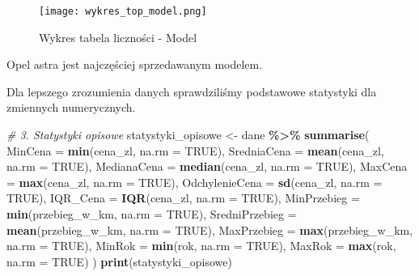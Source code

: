 \documentclass[
]{article}
\newenvironment{Shaded}{\begin{snugshade}}{\end{snugshade}}
\newcommand{\AttributeTok}[1]{\textcolor[rgb]{0.13,0.29,0.53}{#1}}
\newcommand{\CommentTok}[1]{\textcolor[rgb]{0.56,0.35,0.01}{\textit{#1}}}
\newcommand{\ConstantTok}[1]{\textcolor[rgb]{0.56,0.35,0.01}{#1}}
\newcommand{\FunctionTok}[1]{\textcolor[rgb]{0.13,0.29,0.53}{\textbf{#1}}}
\newcommand{\NormalTok}[1]{#1}
\newcommand{\OtherTok}[1]{\textcolor[rgb]{0.56,0.35,0.01}{#1}}
\newcommand{\SpecialCharTok}[1]{\textcolor[rgb]{0.81,0.36,0.00}{\textbf{#1}}}
\begin{document}
\begin{figure}
\centering
\texttt{[image: wykres\_top\_model.png]}
\caption{Wykres tabela liczności - Model}
\end{figure}

Opel astra jest najczęściej sprzedawanym modelem.

Dla lepszego zrozumienia danych sprawdziliśmy podstawowe statystyki dla
zmiennych numerycznych.

\begin{Shaded}
\begin{Highlighting}[]
\CommentTok{\# 3. Statystyki opisowe}
\NormalTok{statystyki\_opisowe }\OtherTok{\textless{}{-}}\NormalTok{ dane }\SpecialCharTok{\%\textgreater{}\%}
  \FunctionTok{summarise}\NormalTok{(}
    \AttributeTok{MinCena =} \FunctionTok{min}\NormalTok{(cena\_zl, }\AttributeTok{na.rm =} \ConstantTok{TRUE}\NormalTok{),}
    \AttributeTok{SredniaCena =} \FunctionTok{mean}\NormalTok{(cena\_zl, }\AttributeTok{na.rm =} \ConstantTok{TRUE}\NormalTok{),}
    \AttributeTok{MedianaCena =} \FunctionTok{median}\NormalTok{(cena\_zl, }\AttributeTok{na.rm =} \ConstantTok{TRUE}\NormalTok{),}
    \AttributeTok{MaxCena =} \FunctionTok{max}\NormalTok{(cena\_zl, }\AttributeTok{na.rm =} \ConstantTok{TRUE}\NormalTok{),}
    \AttributeTok{OdchylenieCena =} \FunctionTok{sd}\NormalTok{(cena\_zl, }\AttributeTok{na.rm =} \ConstantTok{TRUE}\NormalTok{),}
    \AttributeTok{IQR\_Cena =} \FunctionTok{IQR}\NormalTok{(cena\_zl, }\AttributeTok{na.rm =} \ConstantTok{TRUE}\NormalTok{),}
    \AttributeTok{MinPrzebieg =} \FunctionTok{min}\NormalTok{(przebieg\_w\_km, }\AttributeTok{na.rm =} \ConstantTok{TRUE}\NormalTok{),}
    \AttributeTok{SredniPrzebieg =} \FunctionTok{mean}\NormalTok{(przebieg\_w\_km, }\AttributeTok{na.rm =} \ConstantTok{TRUE}\NormalTok{),}
    \AttributeTok{MaxPrzebieg =} \FunctionTok{max}\NormalTok{(przebieg\_w\_km, }\AttributeTok{na.rm =} \ConstantTok{TRUE}\NormalTok{),}
    \AttributeTok{MinRok =} \FunctionTok{min}\NormalTok{(rok, }\AttributeTok{na.rm =} \ConstantTok{TRUE}\NormalTok{),}
    \AttributeTok{MaxRok =} \FunctionTok{max}\NormalTok{(rok, }\AttributeTok{na.rm =} \ConstantTok{TRUE}\NormalTok{)}
\NormalTok{  )}
\FunctionTok{print}\NormalTok{(statystyki\_opisowe)}


\end{Highlighting}
\end{Shaded}
\end{document}
